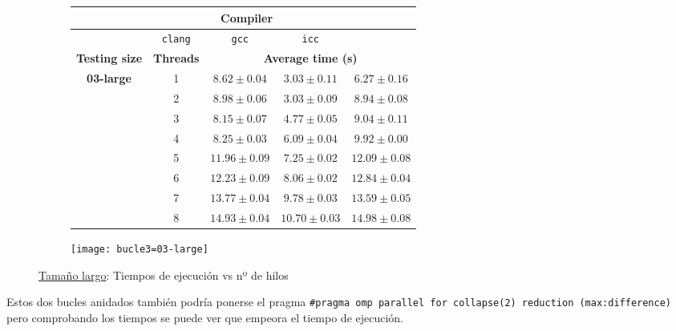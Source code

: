 \begin{figure}[H]
    \centering
    \begin{subfigure}{0.4\textwidth}
        \begin{adjustbox}{width=\textwidth} 
        \begin{tabular}{|c|c|c|c|c|}
            \hline
            \rowcolor{azul} \multicolumn{2}{|c|}{}&\multicolumn{3}{c|}{\textbf{Compiler}} \\ \hline
            \rowcolor{azul} \multicolumn{2}{|c|}{}&\texttt{clang}&\texttt{gcc}&\texttt{icc}\\ \hline
            \rowcolor{azul} \textbf{Testing size} & \textbf{Threads}&\multicolumn{3}{c|}{\textbf{Average time (s)}} \\ \hline
            \multirow{8}{1cm}{\textbf{03-large}} & 1 & \(8.62\pm{0.04}\) & \(3.03\pm{0.11}\) & \(6.27\pm{0.16}\) \\ \cline{2-5}
            & 2 & \(8.98\pm{0.06}\) & \(3.03\pm{0.09}\) & \(8.94\pm{0.08}\) \\ \cline{2-5}
            & 3 & \(8.15\pm{0.07}\) & \(4.77\pm{0.05}\) & \(9.04\pm{0.11}\) \\ \cline{2-5}
            & 4 & \(8.25\pm{0.03}\) & \(6.09\pm{0.04}\) & \(9.92\pm{0.00}\) \\ \cline{2-5}
            & 5 & \(11.96\pm{0.09}\) & \(7.25\pm{0.02}\) & \(12.09\pm{0.08}\) \\ \cline{2-5}
            & 6 & \(12.23\pm{0.09}\) & \(8.06\pm{0.02}\) & \(12.84\pm{0.04}\) \\ \cline{2-5}
            & 7 & \(13.77\pm{0.04}\) & \(9.78\pm{0.03}\) & \(13.59\pm{0.05}\) \\ \cline{2-5}
            & 8 & \(14.93\pm{0.04}\) & \(10.70\pm{0.03}\) & \(14.98\pm{0.08}\) \\ \hline
        \end{tabular}
        \end{adjustbox}
    \end{subfigure}
    \hfill
    \begin{subfigure}{0.5\textwidth}
        \texttt{[image: bucle3=03-large]}
    \end{subfigure}
    \caption{\underline{Tamaño largo}: Tiempos de ejecución vs nº de hilos}
    \label{bucle3=03-large}
\end{figure}

\par Estos dos bucles anidados también podría ponerse el pragma \texttt{\#pragma omp parallel for collapse(2) reduction (max:difference)}
pero comprobando los tiempos se puede ver que empeora el tiempo de ejecución.
